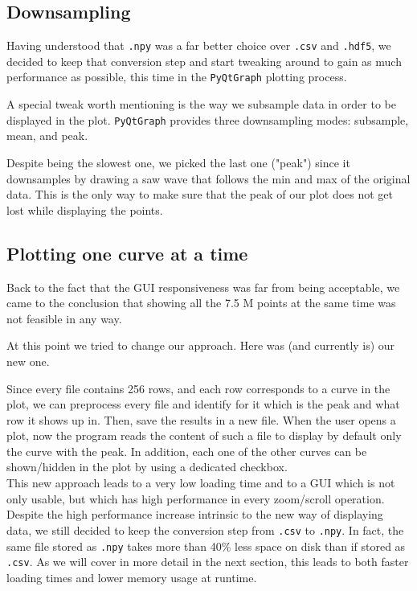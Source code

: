 \documentclass[11pt,a4paper]{article}
\begin{document}
\subsection{Downsampling}

Having understood that \texttt{.npy} was a far better choice over \texttt{.csv} and \texttt{.hdf5}, we decided to keep that conversion step and start tweaking around to gain as much performance as possible, this time in the \texttt{PyQtGraph} plotting process.

A special tweak worth mentioning is the way we subsample data in order to be displayed in the plot.
\texttt{PyQtGraph} provides three downsampling modes: subsample, mean, and peak.

Despite being the slowest one, we picked the last one ("peak") since it downsamples by drawing a saw wave that follows the min and max of the original data. This is the only way to make sure that the peak of our plot does not get lost while displaying the points.\\

\subsection{Plotting one curve at a time}

Back to the fact that the GUI responsiveness was far from being acceptable, we came to the conclusion that showing all the 7.5 M points at the same time was not feasible in any way.

At this point we tried to change our approach. Here was (and currently is) our new one.

Since every file contains 256 rows, and each row corresponds to a curve in the plot, we can preprocess every file and identify for it which is the peak and what row it shows up in. Then, save the results in a new file.
When the user opens a plot, now the program reads the content of such a file to display by default only the curve with the peak. In addition, each one of the other curves can be shown/hidden in the plot by using a dedicated checkbox.\\

This new approach leads to a very low loading time and to a GUI which is not only usable, but which has high performance in every zoom/scroll operation.\\

Despite the high performance increase intrinsic to the new way of displaying data, we still decided to keep the conversion step from \texttt{.csv} to \texttt{.npy}.
In fact, the same file stored as \texttt{.npy} takes more than 40\% less space on disk than if stored as \texttt{.csv}.
As we will cover in more detail in the next section, this leads to both faster loading times and lower memory usage at runtime.
\end{document}
